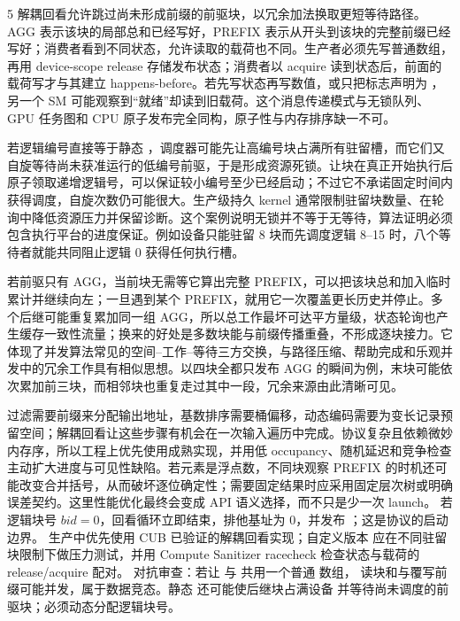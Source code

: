 \begin{solutionexercise}{5}
\conclusionheading 解耦回看允许跳过尚未形成前缀的前驱块，以冗余加法换取更短等待路径。
\discussionheading
{}AGG 表示该块的局部总和已经写好，PREFIX 表示从开头到该块的完整前缀已经写好；消费者看到不同状态，允许读取的载荷也不同。生产者必须先写普通数组，再用 device-scope release 存储发布状态；消费者以 acquire 读到状态后，前面的载荷写才与其建立 happens-before。若先写状态再写数值，或只把标志声明为 ，另一个 SM 可能观察到“就绪”却读到旧载荷。这个消息传递模式与无锁队列、GPU 任务图和 CPU 原子发布完全同构，原子性与内存排序缺一不可。

若逻辑编号直接等于静态 ，调度器可能先让高编号块占满所有驻留槽，而它们又自旋等待尚未获准运行的低编号前驱，于是形成资源死锁。让块在真正开始执行后原子领取递增逻辑号，可以保证较小编号至少已经启动；不过它不承诺固定时间内获得调度，自旋次数仍可能很大。生产级持久 kernel 通常限制驻留块数量、在轮询中降低资源压力并保留诊断。这个案例说明无锁并不等于无等待，算法证明必须包含执行平台的进度保证。例如设备只能驻留 8 块而先调度逻辑 8--15 时，八个等待者就能共同阻止逻辑 0 获得任何执行槽。

若前驱只有 AGG，当前块无需等它算出完整 PREFIX，可以把该块总和加入临时累计并继续向左；一旦遇到某个 PREFIX，就用它一次覆盖更长历史并停止。多个后继可能重复累加同一组 AGG，所以总工作最坏可达平方量级，状态轮询也产生缓存一致性流量；换来的好处是多数块能与前缀传播重叠，不形成逐块接力。它体现了并发算法常见的空间--工作--等待三方交换，与路径压缩、帮助完成和乐观并发中的冗余工作具有相似思想。以四块全都只发布 AGG 的瞬间为例，末块可能依次累加前三块，而相邻块也重复走过其中一段，冗余来源由此清晰可见。

过滤需要前缀来分配输出地址，基数排序需要桶偏移，动态编码需要为变长记录预留空间；解耦回看让这些步骤有机会在一次输入遍历中完成。协议复杂且依赖微妙内存序，所以工程上优先使用成熟实现，并用低 occupancy、随机延迟和竞争检查主动扩大进度与可见性缺陷。若元素是浮点数，不同块观察 PREFIX 的时机还可能改变合并括号，从而破坏逐位确定性；需要固定结果时应采用固定层次树或明确误差契约。这里性能优化最终会变成 API 语义选择，而不只是少一次 launch。
\variantheading 若逻辑块号 $bid=0$，回看循环立即结束，排他基址为 0，并发布
；这是协议的启动边界。
\practiceheading 生产中优先使用 CUB  已验证的解耦回看实现；自定义版本
应在不同驻留块限制下做压力测试，并用 Compute Sanitizer racecheck 检查状态与载荷的
release/acquire 配对。
对抗审查：若让  与  共用一个普通  数组，
读块和与覆写前缀可能并发，属于数据竞态。静态  还可能使后继块占满设备
并等待尚未调度的前驱块；必须动态分配逻辑块号。
\end{solutionexercise}

